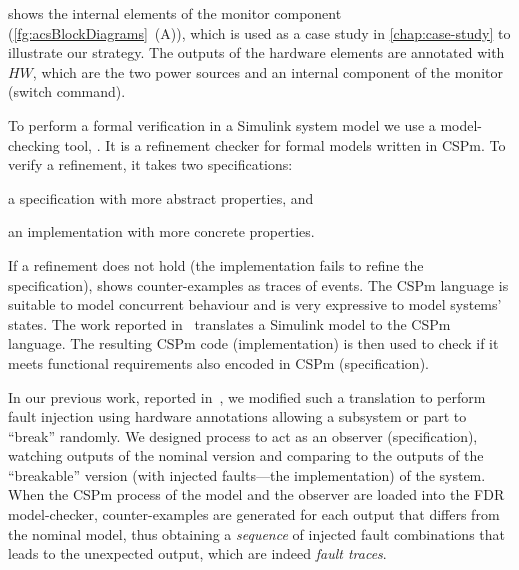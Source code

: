 \documentclass[12pt,openright,twoside,a4paper,oldfontcommands,english,brazil,final]{abntex2}
\theoremstyle{theo}
\newcommand{\textsim}[1]{$#1$}
\newcommand{\simulink}{Simulink\xspace}
\begin{document}
 shows the internal elements of the monitor component (\cref{fg:acsBlockDiagrams}~(A)), which is used as a case study in \cref{chap:case-study} to illustrate our
strategy.
The outputs of the hardware elements are annotated with \textsim{HW}, which are the two power sources and an internal component of the monitor (switch command).


To perform a formal verification in a \simulink system model we use a model-checking tool, .
It is a refinement checker for formal models written in \ac{CSPm}.
To verify a refinement, it takes two specifications:
\begin{alineasinline}
  \item a specification with more abstract properties, and
  \item an implementation with more concrete properties.
\end{alineasinline}
If a refinement does not hold (the implementation fails to refine the specification),  shows counter-examples as traces of events.
The \ac{CSPm} language is suitable to model concurrent behaviour and is very expressive to model systems' states.
The work reported in~\cite{JMS+2011} translates a \simulink model to the \ac{CSPm} language.
%
The resulting \ac{CSPm} code (implementation) is then used to check if it meets functional requirements also encoded in \ac{CSPm} (specification).

In our previous work, reported in~\cite{DM2012}, we modified such a translation to perform fault injection using hardware annotations allowing a subsystem or part to ``break'' randomly.
%
We designed  process to act as an observer (specification), watching outputs of the nominal version and comparing to the outputs of the ``breakable'' version (with injected faults---the implementation) of the system.
%
When the \ac{CSPm} process of the model and the observer are loaded into the \acs{FDR} model-checker, counter-examples are generated for each output that differs from the nominal model, thus obtaining a \emph{sequence} of injected fault combinations that leads to the unexpected output, which are indeed \emph{fault traces}.
\end{document}
